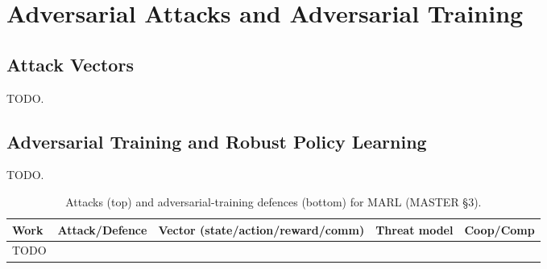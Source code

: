 \section{Adversarial Attacks and Adversarial Training}
\label{sec:adversarial}

\subsection{Attack Vectors}
TODO.

\subsection{Adversarial Training and Robust Policy Learning}
TODO.

\begin{table}[t]\centering\footnotesize
\caption{Attacks (top) and adversarial-training defences (bottom) for MARL (MASTER \S3).}
\label{tab:adversarial}
\begin{tabular}{lllll}
\toprule
Work & Attack/Defence & Vector (state/action/reward/comm) & Threat model & Coop/Comp \\
\midrule
TODO & & & & \\
\bottomrule
\end{tabular}
\end{table}

